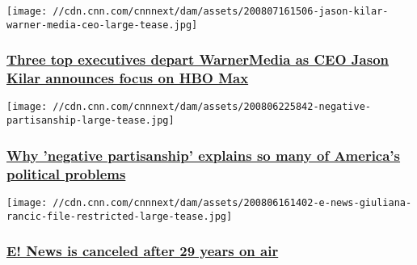 \href{/2020/08/07/media/warnermedia-restructuring-hbo-max/index.html}{}

\texttt{[image: //cdn.cnn.com/cnnnext/dam/assets/200807161506-jason-kilar-warner-media-ceo-large-tease.jpg]}

\hypertarget{three-top-executives-depart-warnermedia-as-ceo-jason-kilar-announces-focus-on-hbo-max}{%
\subsubsection{\texorpdfstring{\href{/2020/08/07/media/warnermedia-restructuring-hbo-max/index.html}{Three
top executives depart WarnerMedia as CEO Jason Kilar announces focus on
HBO
Max}}{Three top executives depart WarnerMedia as CEO Jason Kilar announces focus on HBO Max}}\label{three-top-executives-depart-warnermedia-as-ceo-jason-kilar-announces-focus-on-hbo-max}}

\href{/2020/08/07/media/negative-partisanship-reliable-sources/index.html}{}

\texttt{[image: //cdn.cnn.com/cnnnext/dam/assets/200806225842-negative-partisanship-large-tease.jpg]}

\hypertarget{why-negative-partisanship-explains-so-many-of-americas-political-problems}{%
\subsubsection{\texorpdfstring{\href{/2020/08/07/media/negative-partisanship-reliable-sources/index.html}{Why
'negative partisanship' explains so many of America's political
problems}}{Why 'negative partisanship' explains so many of America's political problems}}\label{why-negative-partisanship-explains-so-many-of-americas-political-problems}}

\href{/2020/08/06/media/e-news-canceled/index.html}{}

\texttt{[image: //cdn.cnn.com/cnnnext/dam/assets/200806161402-e-news-giuliana-rancic-file-restricted-large-tease.jpg]}

\hypertarget{e-news-is-canceled-after-29-years-on-air}{%
\subsubsection{\texorpdfstring{\href{/2020/08/06/media/e-news-canceled/index.html}{E!
News is canceled after 29 years on
air}}{E! News is canceled after 29 years on air}}\label{e-news-is-canceled-after-29-years-on-air}}

\href{/videos/media/2020/08/07/on-the-trail-hbo-max-bash.cnn}{}

